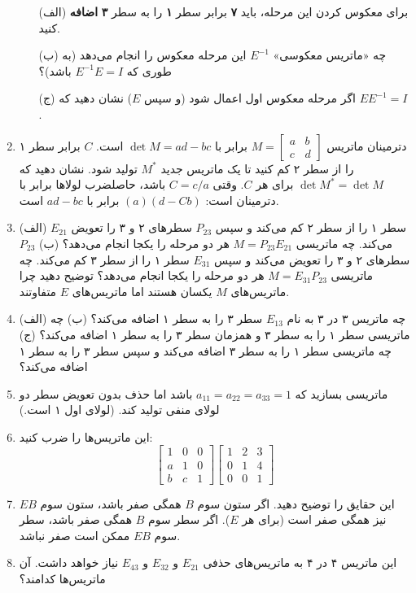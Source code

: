 \documentclass[12pt, a4paper]{book}
\begin{document}
\begin{enumerate}
\begin{itemize}
			\item[(الف)] برای معکوس کردن این مرحله، باید \textbf{۷} برابر سطر \textbf{۱} را به سطر \textbf{۳} \textbf{اضافه} کنید.
			\item[(ب)] چه «ماتریس معکوسی» $E^{-1}$ این مرحله معکوس را انجام می‌دهد (به طوری که $E^{-1}E=I$ باشد)؟
			\item[(ج)] اگر مرحله معکوس اول اعمال شود (و سپس $E$) نشان دهید که $EE^{-1}=I$.
		\end{itemize}
		\item دترمینان ماتریس $M = \begin{bmatrix} a & b \\ c & d \end{bmatrix}$ برابر با $\det M = ad-bc$ است. $C$ برابر سطر ۱ را از سطر ۲ کم کنید تا یک ماتریس جدید $M^*$ تولید شود. نشان دهید که $\det M^* = \det M$ برای هر $C$. وقتی $C=c/a$ باشد، حاصلضرب لولاها برابر با دترمینان است: $(a)(d-Cb)$ برابر با $ad-bc$ است.
		\item (الف) $E_{21}$ سطر ۱ را از سطر ۲ کم می‌کند و سپس $P_{23}$ سطرهای ۲ و ۳ را تعویض می‌کند. چه ماتریسی $M=P_{23}E_{21}$ هر دو مرحله را یکجا انجام می‌دهد؟
		(ب) $P_{23}$ سطرهای ۲ و ۳ را تعویض می‌کند و سپس $E_{31}$ سطر ۱ را از سطر ۳ کم می‌کند. چه ماتریسی $M=E_{31}P_{23}$ هر دو مرحله را یکجا انجام می‌دهد؟ توضیح دهید چرا ماتریس‌های $M$ یکسان هستند اما ماتریس‌های $E$ متفاوتند.
		\item (الف) چه ماتریس ۳ در ۳ به نام $E_{13}$ سطر ۳ را به سطر ۱ اضافه می‌کند؟
		(ب) چه ماتریسی سطر ۱ را به سطر ۳ و همزمان سطر ۳ را به سطر ۱ اضافه می‌کند؟
		(ج) چه ماتریسی سطر ۱ را به سطر ۳ اضافه می‌کند و سپس سطر ۳ را به سطر ۱ اضافه می‌کند؟
		\item ماتریسی بسازید که $a_{11}=a_{22}=a_{33}=1$ باشد اما حذف بدون تعویض سطر دو لولای منفی تولید کند. (لولای اول ۱ است.)
		\item این ماتریس‌ها را ضرب کنید:
		\[ \begin{bmatrix} 1 & 0 & 0 \\ a & 1 & 0 \\ b & c & 1 \end{bmatrix} \begin{bmatrix} 1 & 2 & 3 \\ 0 & 1 & 4 \\ 0 & 0 & 1 \end{bmatrix} \]
		\item این حقایق را توضیح دهید. اگر ستون سوم $B$ همگی صفر باشد، ستون سوم $EB$ نیز همگی صفر است (برای هر $E$). اگر سطر سوم $B$ همگی صفر باشد، سطر سوم $EB$ ممکن است صفر نباشد.
		\item این ماتریس ۴ در ۴ به ماتریس‌های حذفی $E_{21}$ و $E_{32}$ و $E_{43}$ نیاز خواهد داشت. آن ماتریس‌ها کدامند؟

\end{enumerate}
\end{document}
